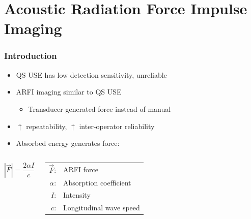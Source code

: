 \documentclass{beamer}
\begin{document}
	\section[ARFI]{Acoustic Radiation Force Impulse Imaging}
		\begin{frame}
			\frametitle{Introduction}
			\begin{itemize}
				\item QS USE has low detection sensitivity, unreliable
				\item \alert{ARFI} imaging similar to QS USE
				\begin{itemize}
					\item \alert{Transducer-generated} force instead of manual
				\end{itemize}
				\item $\uparrow$ repeatability, $\uparrow$ inter-operator reliability
				\item Absorbed energy generates force:
			\end{itemize}

			\vspace{1cm}
			\begin{columns}[c]
					\begin{equation*}
						\left|\vec{F}\right| = \frac{2\alpha I}{c}
					\end{equation*}

					\begin{tabular}{rl}
						$\vec{F}$: & ARFI force \\
						$\alpha$: & Absorption coefficient \\
						$I$: & Intensity \\
						$c$: & Longitudinal wave speed \\
					\end{tabular}
			\end{columns}
		\end{frame}
\end{document}
